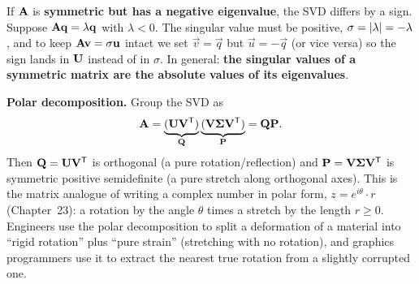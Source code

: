 If $\mathbf{A}$ is \textbf{symmetric but has a negative eigenvalue}, the SVD differs
by a sign. Suppose $\mathbf{A}\mathbf{q} = \lambda\mathbf{q}$ with $\lambda < 0$. The
singular value must be positive, $\sigma = \lvert\lambda\rvert = -\lambda$, and to keep
$\mathbf{A}\mathbf{v} = \sigma\mathbf{u}$ intact we set $\vec{v} = \vec{q}$ but
$\vec{u} = -\vec{q}$ (or vice versa) so the sign lands in $\mathbf{U}$ instead of in
$\sigma$. In general: \textbf{the singular values of a symmetric matrix are the
absolute values of its eigenvalues}.

\begin{connectionbox}
\textbf{Polar decomposition.} Group the SVD as
\[
  \mathbf{A} = \underbrace{(\mathbf{U}\mathbf{V}^{\mathsf{T}})}_{\mathbf{Q}}
            \underbrace{(\mathbf{V}\mathbf{\Sigma}\mathbf{V}^{\mathsf{T}})}_{\mathbf{P}} = \mathbf{Q}\mathbf{P}.
\]
Then $\mathbf{Q} = \mathbf{U}\mathbf{V}^{\mathsf{T}}$ is orthogonal (a pure rotation/reflection) and
$\mathbf{P} = \mathbf{V}\mathbf{\Sigma}\mathbf{V}^{\mathsf{T}}$ is symmetric positive semidefinite (a
pure stretch along orthogonal axes). This is the matrix analogue of writing a
complex number in polar form, $z = e^{i\theta}\cdot r$ (Chapter~23): a rotation
by the angle $\theta$ times a stretch by the length $r \ge 0$. Engineers
use the polar decomposition to split a deformation of a material into ``rigid
rotation'' plus ``pure strain'' (stretching with no rotation), and graphics
programmers use it to extract the nearest true
rotation from a slightly corrupted one.
\end{connectionbox}

